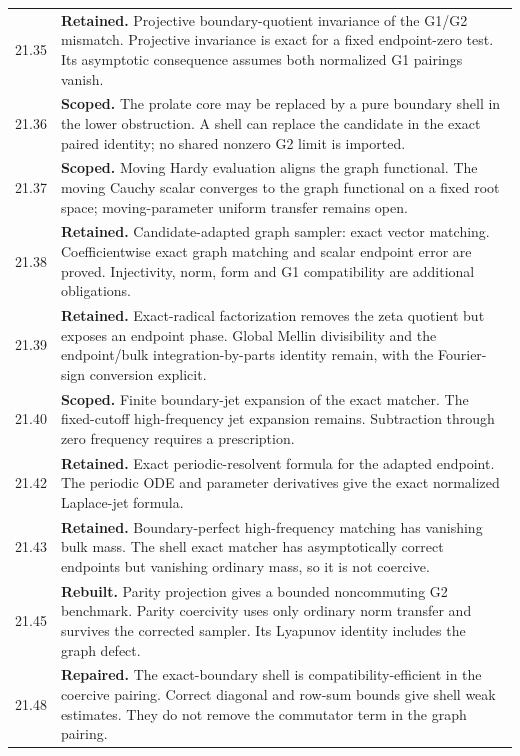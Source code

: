 \documentclass[11pt]{article}
\theoremstyle{remark}
\begin{document}
\begin{longtable}{@{}p{}p{}@{}}
21.35 & \textbf{Retained.} Projective boundary-quotient invariance of the G1/G2 mismatch. Projective invariance is exact for a fixed endpoint-zero test. Its asymptotic consequence assumes both normalized G1 pairings vanish. \\[4pt]
21.36 & \textbf{Scoped.} The prolate core may be replaced by a pure boundary shell in the lower obstruction. A shell can replace the candidate in the exact paired identity; no shared nonzero G2 limit is imported. \\[4pt]
21.37 & \textbf{Scoped.} Moving Hardy evaluation aligns the graph functional. The moving Cauchy scalar converges to the graph functional on a fixed root space; moving-parameter uniform transfer remains open. \\[4pt]
21.38 & \textbf{Retained.} Candidate-adapted graph sampler: exact vector matching. Coefficientwise exact graph matching and scalar endpoint error are proved. Injectivity, norm, form and G1 compatibility are additional obligations. \\[4pt]
21.39 & \textbf{Retained.} Exact-radical factorization removes the zeta quotient but exposes an endpoint phase. Global Mellin divisibility and the endpoint/bulk integration-by-parts identity remain, with the Fourier-sign conversion explicit. \\[4pt]
21.40 & \textbf{Scoped.} Finite boundary-jet expansion of the exact matcher. The fixed-cutoff high-frequency jet expansion remains. Subtraction through zero frequency requires a prescription. \\[4pt]
21.42 & \textbf{Retained.} Exact periodic-resolvent formula for the adapted endpoint. The periodic ODE and parameter derivatives give the exact normalized Laplace-jet formula. \\[4pt]
21.43 & \textbf{Retained.} Boundary-perfect high-frequency matching has vanishing bulk mass. The shell exact matcher has asymptotically correct endpoints but vanishing ordinary mass, so it is not coercive. \\[4pt]
21.45 & \textbf{Rebuilt.} Parity projection gives a bounded noncommuting G2 benchmark. Parity coercivity uses only ordinary norm transfer and survives the corrected sampler. Its Lyapunov identity includes the graph defect. \\[4pt]
21.48 & \textbf{Repaired.} The exact-boundary shell is compatibility-efficient in the coercive pairing. Correct diagonal and row-sum bounds give shell weak estimates. They do not remove the commutator term in the graph pairing. \\[4pt]

\end{longtable}
\end{document}

